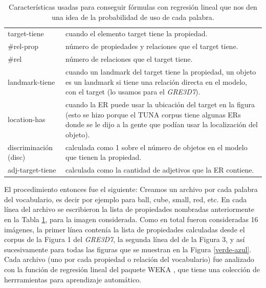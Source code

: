 \begin{small}
\begin{table}[h]
\begin{center}
\begin{tabular}{|l|p{10cm}|}
\hline
target-tiene & cuando el elemento target tiene la propiedad. \\
\#rel-prop & n\'umero de propiedades y relaciones que el target tiene.\\
\#rel & n\'umero de relaciones que el target tiene. \\
landmark-tiene & cuando un landmark del target tiene la propiedad, un objeto es un landmark si tiene una relaci\'on directa en el modelo, con el target (lo usamos para el \textit{GRE3D7}).\\
location-has & cuando la ER puede usar la ubicaci\'on del target en la figura (esto se hizo porque el TUNA corpus tiene algunas ERs donde se le dijo a la gente que pod\'ian usar la localizaci\'on del objeto).\\
discriminaci\'on (disc) & calculada como 1 sobre el n\'umero de objetos en el modelo que tienen la propiedad.  \\
adj-target-tiene & calculada como la cantidad de adjetivos que la ER contiene.\\
\hline
\end{tabular}
\caption{Caracter\'isticas usadas para conseguir f\'ormulas con regresi\'on lineal que nos den una idea de la probabilidad de uso de cada palabra.} 
\label{features}
\end{center}
\end{table}
\end{small}

El procedimiento entonces fue el siguiente:
Creamos un archivo por cada palabra del vocabulario, es decir por ejemplo para ball, cube, small, red, etc. En cada l\'inea del archivo 
se escribieron la lista de propiedades nombradas anteriormente en la Tabla \ref{features}, para la imagen considerada. Como en total 
fueron consideradas 16 im\'agenes, la primer l\'inea conten\'ia la lista de propiedades calculadas desde el corpus de la Figura 1 del \textit{GRE3D7}, 
la segunda l\'inea del de la Figura 3, y as\'i sucesivamente para todas las figuras que se muestran en la Figura \ref{verde-azul}. 
Cada archivo (uno por cada propiedad o relaci\'on del vocabulario) fue analizado con la funci\'on de regresi\'on lineal del paquete WEKA 
\cite{Hall:WEK09}, que tiene una colecci\'on de herrramientas para aprendizaje autom\'atico.

